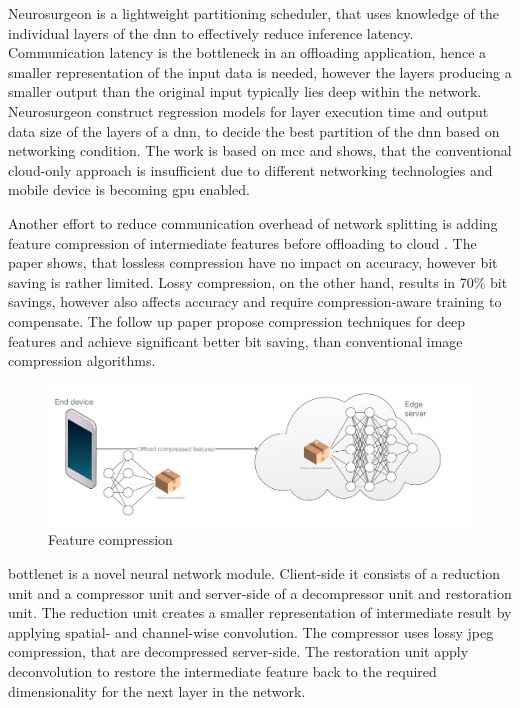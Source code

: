 Neurosurgeon \cite{kang_neurosurgeon:_2017} is a lightweight partitioning scheduler, that uses knowledge of the individual layers of the \gls{dnn} to effectively reduce inference latency. Communication latency is the bottleneck in an offloading application, hence a smaller representation of the input data is needed, however the layers producing a smaller output than the original input typically lies deep within the network. Neurosurgeon construct regression models for layer execution time and  output data size of the layers of a \gls{dnn}, to decide the best partition of the \gls{dnn} based on networking condition. The work is based on \gls{mcc} and shows, that the conventional cloud-only approach is insufficient due to different networking technologies and mobile device is becoming \gls{gpu} enabled. 

Another effort to reduce communication overhead of network splitting is adding feature compression of intermediate features before offloading to cloud \cite{choi_deep_2018}. The paper shows, that lossless compression have no impact on accuracy, however bit saving is rather limited. Lossy compression, on the other hand, results in 70\% bit savings, however also affects accuracy and require compression-aware training to compensate. The follow up paper \cite{choi_near-lossless_2018} propose compression techniques for deep features and achieve significant better bit saving, than conventional image compression algorithms.

\begin{figure}
	\centering
	\includegraphics[width=\linewidth]{figures/models/compressed}
	\caption[Feature compression]{Feature compression}
\end{figure}

\gls{bottlenet} \cite{eshratifar_bottlenet:_2019} is a novel neural network module. Client-side it consists of a reduction unit and a compressor unit and server-side of a decompressor unit and restoration unit. The reduction unit creates a smaller representation of intermediate result by applying spatial- and channel-wise convolution. The compressor uses lossy \gls{jpeg} compression, that are decompressed server-side. The restoration unit apply deconvolution to restore the intermediate feature back to the required dimensionality for the next layer in the network.

